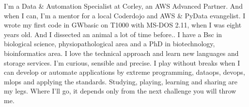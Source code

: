 \documentclass[8pt]{stackoverflow-upgraded-version} %
\begin{document}
\begin{minipage}[t]{0.45\textwidth} %
	\vspace{-\baselineskip} %
	I'm a Data \& Automation Specialist at Corley, an AWS Advanced Partner.
	And when I can, I'm a mentor for a local Coderdojo and AWS \& PyData evangelist.
	I wrote my first code in GWbasic on T1000 with MS-DOS 2.11, when I was eight years old. And I dissected an animal a lot of time before..
	I have a Bsc in biological science, physiopathological area and a PhD in biotechnology, bioinformatics area.
	I love the technical approach and learn new languages and storage services. I'm curious, sensible and precise.
	I play without breaks when I can develop or automate applications by extreme programming, dataops, devops, mlops and applying the standards.
	Studying, playing, learning and sharing are my legs. Where I'll go, it depends only from the next challenge you will throw me.
	\\
\end{minipage}
\hfill %
\begin{minipage}[t]{0.5\textwidth} %
	\vspace{-26pt} %
	\begin{barchart}{5.5}
	\end{barchart}
	\\
\end{minipage}

\end{document}
